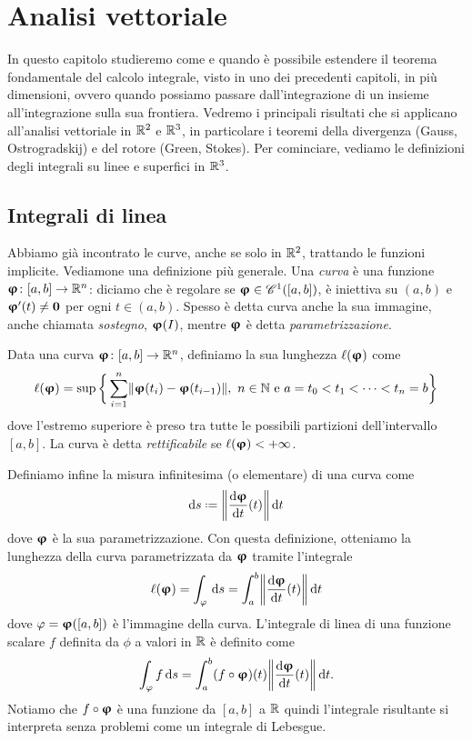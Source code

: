 \chapter{Analisi vettoriale}
In questo capitolo studieremo come e quando è possibile estendere il teorema fondamentale del calcolo integrale, visto in uno dei precedenti capitoli, in più dimensioni, ovvero quando possiamo passare dall'integrazione di un insieme all'integrazione sulla sua frontiera.
Vedremo i principali risultati che si applicano all'analisi vettoriale in $\R^2$ e $\R^3$, in particolare i teoremi della divergenza (Gauss, Ostrogradskij) e del rotore (Green, Stokes).
Per cominciare, vediamo le definizioni degli integrali su linee e superfici in $\R^3$.

\section{Integrali di linea}
Abbiamo già incontrato le curve, anche se solo in $\R^2$, trattando le funzioni implicite.
Vediamone una definizione più generale.
Una \emph{curva} è una funzione $\vphi\colon [a,b]\to\R^n$: diciamo che è regolare se $\vphi\in\cont[1]{[a,b]}$, è iniettiva su $(a,b)$ e $\vphi'(t)\ne\vec 0$ per ogni $t\in(a,b)$.
Spesso è detta curva anche la sua immagine, anche chiamata \emph{sostegno}, $\vphi(I)$, mentre $\vphi$ è detta \emph{parametrizzazione}.

\begin{definizione} \label{d:lunghezza-curva}
	Data una curva $\vphi\colon[a,b]\to\R^n$, definiamo la sua lunghezza $\ell(\vphi)$ come
	\begin{equation}
		\ell(\vphi)=\sup\bigg\{\sum_{i=1}^n\norm{\vphi(t_i)-\vphi(t_{i-1})},\ n\in\N\text{ e }a=t_0<t_1<\cdots<t_n=b\bigg\}
		\label{eq:lunghezza-curva}
	\end{equation}
	dove l'estremo superiore è preso tra tutte le possibili partizioni dell'intervallo $[a,b]$.
	La curva è detta \emph{rettificabile} se $\ell(\vphi)<+\infty$.
\end{definizione}

Definiamo infine la misura infinitesima (o elementare) di una curva come
\begin{equation}
	\dd s\defeq\norm[\bigg]{\drv{\vphi}{t}(t)}\,\dd t
	\label{eq:misura-curva}
\end{equation}
dove $\vphi$ è la sua parametrizzazione.
Con questa definizione, otteniamo la lunghezza della curva parametrizzata da $\vphi$ tramite l'integrale
\begin{equation}
	\ell(\vphi)=\int_\phi\,\dd s=\int_a^b\norm[\bigg]{\drv{\vphi}{t}(t)}\,\dd t
\end{equation}
dove $\phi=\vphi([a,b])$ è l'immagine della curva.
L'integrale di linea di una funzione scalare $f$ definita da $\phi$ a valori in $\R$ è definito come
\begin{equation}
	\int_\phi f\,\dd s=\int_a^b(f\circ\vphi)(t)\norm[\bigg]{\drv{\vphi}{t}(t)}\,\dd t.
\end{equation}
Notiamo che $f\circ\vphi$ è una funzione da $[a,b]$ a $\R$ quindi l'integrale risultante si interpreta senza problemi come un integrale di Lebesgue.

